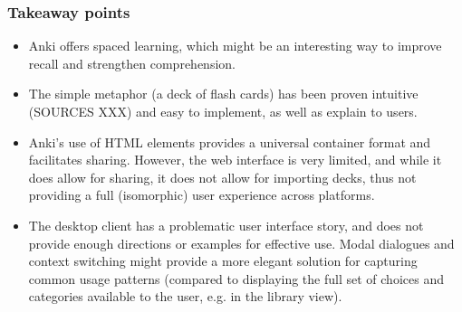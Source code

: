 \subsubsection{Takeaway points}

\begin{itemize}
\item Anki offers spaced learning, which might be an interesting way to improve
  recall and strengthen comprehension.
\item The simple metaphor (a deck of flash cards) has been proven intuitive (SOURCES
  XXX) and easy to implement, as well as explain to users.
\item Anki's use of HTML elements provides a universal container format and
  facilitates sharing. However, the web interface is very limited, and while it
  does allow for sharing, it does not allow for importing decks, thus not
  providing a full (isomorphic) user experience across platforms.
\item The desktop client has a problematic user interface story, and does not
  provide enough directions or examples for effective use. Modal dialogues and
  context switching might provide a more elegant solution for capturing common
  usage patterns (compared to displaying the full set of choices and categories
  available to the user, e.g. in the library view).
\end{itemize}
